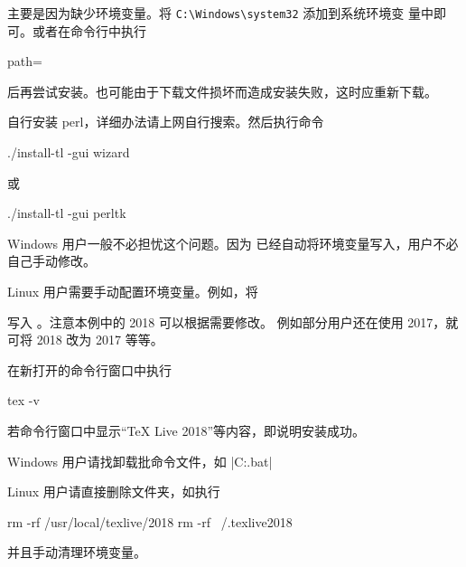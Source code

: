 
主要是因为缺少环境变量。将 \verb|C:\Windows\system32| 添加到系统环境变
量中即可。或者在命令行中执行
\begin{shcode}
  path=%
\end{shcode}
后再尝试安装。也可能由于下载文件损坏而造成安装失败，这时应重新下载。



自行安装 perl，详细办法请上网自行搜索。然后执行命令
\begin{shcode}
  ./install-tl -gui wizard
\end{shcode}
或
\begin{shcode}
  ./install-tl -gui perltk
\end{shcode}



Windows 用户一般不必担忧这个问题。因为 \TeXLive{} 已经自动将环境变量写入，用户不必自己手动修改。

Linux 用户需要手动配置环境变量。例如，将

写入 。注意本例中的 2018 可以根据需要修改。
例如部分用户还在使用 \TeXLive{} 2017，就可将 2018 改为 2017 等等。



在新打开的命令行窗口中执行
\begin{shcode}
  tex -v
\end{shcode}
若命令行窗口中显示“TeX Live 2018”等内容，即说明安装成功。



Windows 用户请找卸载批命令文件，如 |C:\texlive{}\tlpkg\installer\uninst.bat|

Linux 用户请直接删除文件夹，如执行
\begin{shcode}
  rm -rf /usr/local/texlive/2018
  rm -rf ~/.texlive2018
\end{shcode}
并且手动清理环境变量。


